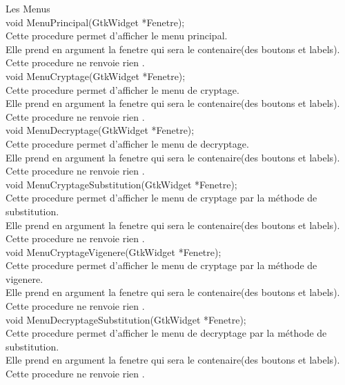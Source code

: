\documentclass[a4]{article}
\begin{document}
		Les Menus\\
		
	void MenuPrincipal(GtkWidget *Fenetre);\\
		Cette procedure permet d'afficher le menu principal.\\
		Elle prend en argument la fenetre qui sera le contenaire(des boutons et labels).\\
		Cette procedure ne renvoie rien .\\
	
	void MenuCryptage(GtkWidget *Fenetre);\\
		Cette procedure permet d'afficher le menu de cryptage.\\
		Elle prend en argument la fenetre qui sera le contenaire(des boutons et labels).\\
		Cette procedure ne renvoie rien .\\
	
	void MenuDecryptage(GtkWidget *Fenetre);\\
		Cette procedure permet d'afficher le menu de decryptage.\\
		Elle prend en argument la fenetre qui sera le contenaire(des boutons et labels).\\
		Cette procedure ne renvoie rien .\\
	
	void MenuCryptageSubstitution(GtkWidget *Fenetre);\\
		Cette procedure permet d'afficher le menu de cryptage par la méthode de substitution.\\
		Elle prend en argument la fenetre qui sera le contenaire(des boutons et labels).\\
		Cette procedure ne renvoie rien .\\
	
	void MenuCryptageVigenere(GtkWidget *Fenetre);\\
		Cette procedure permet d'afficher le menu de cryptage par la méthode de vigenere.\\
		Elle prend en argument la fenetre qui sera le contenaire(des boutons et labels).\\
		Cette procedure ne renvoie rien .\\
	
	void MenuDecryptageSubstitution(GtkWidget *Fenetre);\\
		Cette procedure permet d'afficher le menu de decryptage par la méthode de substitution.\\
		Elle prend en argument la fenetre qui sera le contenaire(des boutons et labels).\\
		Cette procedure ne renvoie rien .\\
	
\end{document}
